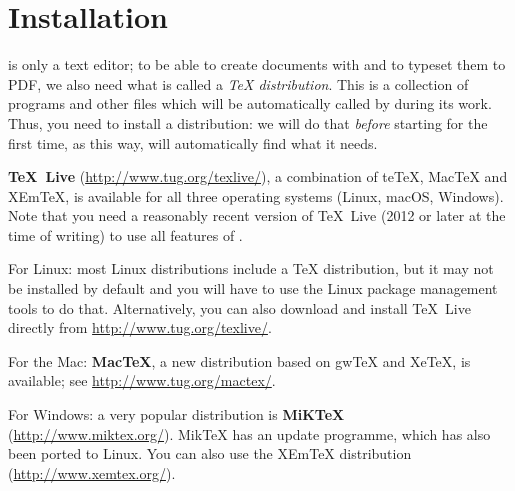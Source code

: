 
\chapter{Installation}
\label{chap.installation}

\Tw{} is only a text editor; to be able to create documents with \AllTeX{} and to typeset them to PDF, we also need what is called a \emph{{\TeX} distribution}. This is a collection of programs and other files which will be automatically called by {\Tw} during its work. Thus, you need to install a distribution: we will do that \emph{before} starting {\Tw} for the first time, as this way, {\Tw} will automatically find what it needs.

\textbf{TeX~Live} (\url{http://www.tug.org/texlive/}), a combination of teTeX, MacTeX and XEmTeX, is available for all three operating systems (Linux, macOS, Windows). Note that you need a reasonably recent version of TeX~Live (2012 or later at the time of writing) to use all features of {\Tw}.

\begin{OSLinux}
For Linux: most Linux distributions include a {\TeX} distribution, but it may not be installed by default and you will have to use the Linux package management tools to do that. Alternatively, you can also download and install TeX~Live directly from \url{http://www.tug.org/texlive/}.
\end{OSLinux}

\begin{OSMac}
For the Mac: \textbf{MacTeX}, a new distribution based on gwTeX and XeTeX, is available; see \url{http://www.tug.org/mactex/}.
\end{OSMac}

\begin{OSWindows}
For Windows: a very popular distribution is \textbf{MiKTeX} (\url{http://www.miktex.org/}). MikTeX has an update programme, which has also been ported to Linux. You can also use the XEmTeX distribution (\url{http://www.xemtex.org/}).
\end{OSWindows}

